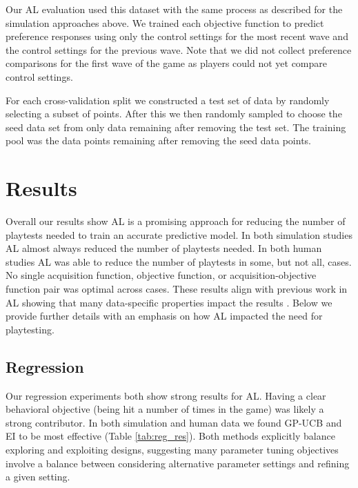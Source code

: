 \documentclass{sig-alternate}
\begin{document}

Our AL evaluation used this dataset with the same process as described for the simulation approaches above.
We trained each objective function to predict preference responses using only the control settings for the most recent wave and the control settings for the previous wave.
Note that we did not collect preference comparisons for the first wave of the game as players could not yet compare control settings.

For each cross-validation split we constructed a test set of data by randomly selecting a subset of points.
After this we then randomly sampled to choose the seed data set from only data remaining after removing the test set.
The training pool was the data points remaining after removing the seed data points.



\section{Results}

Overall our results show AL is a promising approach for reducing the number of playtests needed to train an accurate predictive model.
In both simulation studies AL almost always reduced the number of playtests needed.
In both human studies AL was able to reduce the number of playtests in some, but not all, cases.
No single acquisition function, objective function, or acquisition-objective function pair was optimal across cases.
These results align with previous work in AL showing that many data-specific properties impact the results \cite{schein2007:al-logreg-eval}.
Below we provide further details with an emphasis on how AL impacted the need for playtesting.


\subsection{Regression}

Our regression experiments both show strong results for AL.
Having a clear behavioral objective (being hit a number of times in the game) was likely a strong contributor.
In both simulation and human data we found GP-UCB and EI to be most effective (Table \ref{tab:reg_res}).
Both methods explicitly balance exploring and exploiting designs, suggesting many parameter tuning objectives involve a balance between considering alternative parameter settings and refining a given setting.
\end{document}
